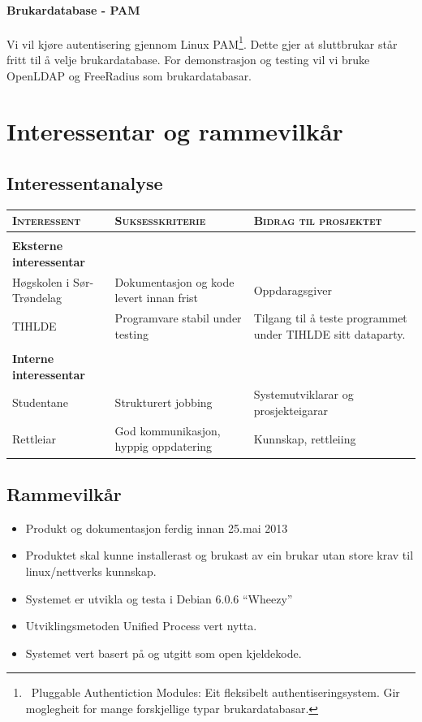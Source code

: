 \documentclass[nynorsk,12pt,a4paper]{article}
\begin{document}
\paragraph{Brukardatabase - PAM} 
Vi vil kjøre autentisering gjennom Linux PAM\footnote{\ Pluggable Authentiction Modules: Eit fleksibelt authentiseringsystem. Gir moglegheit for mange forskjellige typar brukardatabasar.}. Dette gjer at sluttbrukar står fritt til å velje brukardatabase. For demonstrasjon og testing vil vi bruke OpenLDAP og FreeRadius som brukardatabasar.

\newpage
\section{Interessentar og rammevilkår}
\subsection{Interessentanalyse}
\begin{table}[h!]
	\begin{tabular}{p{5cm} p{5cm} p{5cm} }
		\textsc{Interessent} & \textsc{Suksesskriterie} & \textsc{Bidrag til prosjektet}\\ \hline \\
		\textbf{Eksterne interessentar} & ~ & ~ \\ 
		Høgskolen i Sør-Trøndelag & Dokumentasjon og kode levert innan frist & Oppdaragsgiver \\ 
		TIHLDE & Programvare stabil under testing & Tilgang til å teste programmet under TIHLDE sitt dataparty. \\ \\
		\textbf{Interne interessentar} & ~ & ~ \\ 
		Studentane & Strukturert jobbing & Systemutviklarar og prosjekteigarar \\ 
		Rettleiar & God kommunikasjon, hyppig oppdatering & Kunnskap, rettleiing  \\ 
	\end{tabular}
\end{table}


\subsection{Rammevilkår}
\begin{itemize}
	\item Produkt og dokumentasjon ferdig innan 25.mai 2013
	\item Produktet skal kunne installerast og brukast av ein brukar utan store krav til linux/nettverks kunnskap.
	\item Systemet er utvikla og testa i Debian 6.0.6 “Wheezy”
	\item Utviklingsmetoden Unified Process vert nytta.
	\item Systemet vert basert på og utgitt som open kjeldekode. 
\end{itemize}
\end{document}
